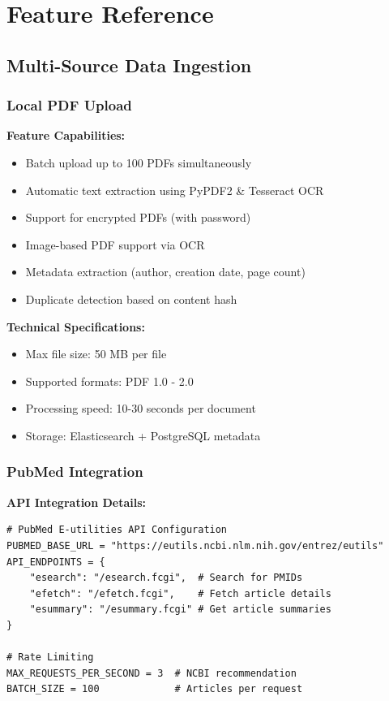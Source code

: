 
\chapter{Feature Reference}

\section{Multi-Source Data Ingestion}

\subsection{Local PDF Upload}

\textbf{Feature Capabilities:}
\begin{itemize}
    \item Batch upload up to 100 PDFs simultaneously
    \item Automatic text extraction using PyPDF2 \& Tesseract OCR
    \item Support for encrypted PDFs (with password)
    \item Image-based PDF support via OCR
    \item Metadata extraction (author, creation date, page count)
    \item Duplicate detection based on content hash
\end{itemize}

\textbf{Technical Specifications:}
\begin{itemize}
    \item Max file size: 50 MB per file
    \item Supported formats: PDF 1.0 - 2.0
    \item Processing speed: 10-30 seconds per document
    \item Storage: Elasticsearch + PostgreSQL metadata
\end{itemize}

\subsection{PubMed Integration}

\textbf{API Integration Details:}
\begin{lstlisting}[style=pythonstyle]
# PubMed E-utilities API Configuration
PUBMED_BASE_URL = "https://eutils.ncbi.nlm.nih.gov/entrez/eutils"
API_ENDPOINTS = {
    "esearch": "/esearch.fcgi",  # Search for PMIDs
    "efetch": "/efetch.fcgi",    # Fetch article details
    "esummary": "/esummary.fcgi" # Get article summaries
}

# Rate Limiting
MAX_REQUESTS_PER_SECOND = 3  # NCBI recommendation
BATCH_SIZE = 100             # Articles per request
\end{lstlisting}

